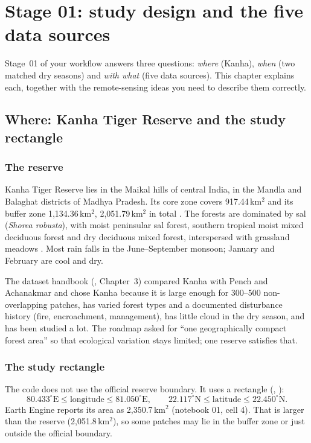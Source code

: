 \chapter{Stage 01: study design and the five data sources}
\label{ch:stage01}

Stage~01 of your workflow answers three questions: \emph{where} (Kanha), \emph{when} (two matched dry seasons) and \emph{with what} (five data sources). This chapter explains each, together with the remote-sensing ideas you need to describe them correctly.

\section{Where: Kanha Tiger Reserve and the study rectangle}
\label{sec:studyarea}

\subsection{The reserve}

Kanha Tiger Reserve lies in the Maikal hills of central India, in the Mandla and Balaghat districts of Madhya Pradesh. Its core zone covers 917.44\,km$^2$ and its buffer zone 1,134.36\,km$^2$, 2,051.79\,km$^2$ in total \citep{kanha2026}. The forests are dominated by sal (\emph{Shorea robusta}), with moist peninsular sal forest, southern tropical moist mixed deciduous forest and dry deciduous mixed forest, interspersed with grassland meadows \citep{kanha2026}. Most rain falls in the June--September monsoon; January and February are cool and dry.

\begin{whybox}
The dataset handbook (, Chapter~3) compared Kanha with Pench and Achanakmar and chose Kanha because it is large enough for 300--500 non-overlapping patches, has varied forest types and a documented disturbance history (fire, encroachment, management), has little cloud in the dry season, and has been studied a lot. The roadmap asked for ``one geographically compact forest area'' so that ecological variation stays limited; one reserve satisfies that.
\end{whybox}

\subsection{The study rectangle}

The code does not use the official reserve boundary. It uses a rectangle (, ):
\[
80.433^\circ\text{E} \le \text{longitude} \le 81.050^\circ\text{E}, \qquad 22.117^\circ\text{N} \le \text{latitude} \le 22.450^\circ\text{N}.
\]
Earth Engine reports its area as 2,350.7\,km$^2$ (notebook 01, cell 4). That is larger than the reserve (2,051.8\,km$^2$), so some patches may lie in the buffer zone or just outside the official boundary.


